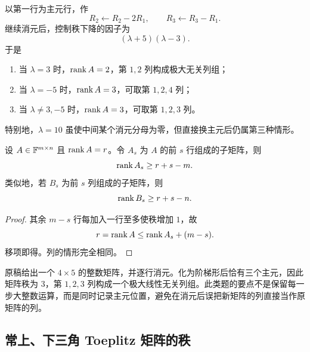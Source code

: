 \begin{solution}
以第一行为主元行，作
\begin{equation}
 R_2\leftarrow R_2-2R_1,
 \qquad
 R_3\leftarrow R_3-R_1.
\end{equation}
继续消元后，控制秩下降的因子为
\begin{equation}
 (\lambda+5)(\lambda-3).
\end{equation}
于是
\begin{enumerate}
  \item 当 $\lambda=3$ 时，$\operatorname{rank} A=2$，第 $1,2$ 列构成极大无关列组；
  \item 当 $\lambda=-5$ 时，$\operatorname{rank} A=3$，可取第 $1,2,4$ 列；
  \item 当 $\lambda\neq3,-5$ 时，$\operatorname{rank} A=3$，可取第 $1,2,3$ 列。
\end{enumerate}
特别地，$\lambda=10$ 虽使中间某个消元分母为零，但直接换主元后仍属第三种情形。
\end{solution}

\begin{proposition}[截取若干行或列后的秩下界]
设 $A\in\mathbb F^{m\times n}$ 且 $\operatorname{rank} A=r$。令 $A_s$ 为 $A$ 的前 $s$ 行组成的子矩阵，则
\begin{equation}
 \operatorname{rank} A_s\geq r+s-m.
\end{equation}
类似地，若 $B_s$ 为前 $s$ 列组成的子矩阵，则
\begin{equation}
 \operatorname{rank} B_s\geq r+s-n.
\end{equation}
\end{proposition}

\begin{proof}
其余 $m-s$ 行每加入一行至多使秩增加 $1$，故
\begin{equation}
 r=\operatorname{rank} A\leq\operatorname{rank} A_s+(m-s).
\end{equation}
移项即得。列的情形完全相同。
\end{proof}

\begin{example}[数值矩阵的消元]
原稿给出一个 $4\times5$ 的整数矩阵，并逐行消元。化为阶梯形后恰有三个主元，因此矩阵秩为 $3$，第 $1,2,3$ 列构成一个极大线性无关列组。此类题的要点不是保留每一步大整数运算，而是同时记录主元位置，避免在消元后误把新矩阵的列直接当作原矩阵的列。
\end{example}

\subsection{常上、下三角 Toeplitz 矩阵的秩}

